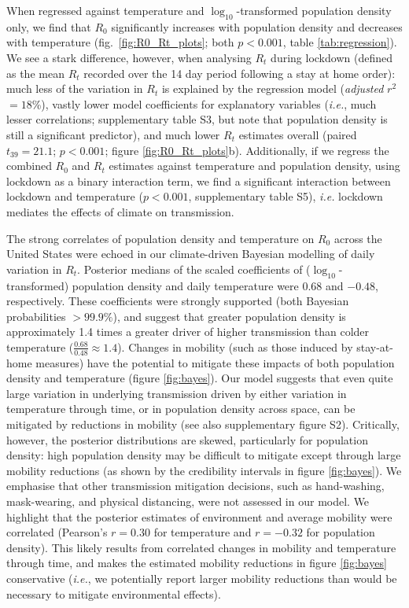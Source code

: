 \documentclass[12pt,english,a4paper]{article}
\newcommand{\RO}{$R_0$\xspace}
\begin{document}
When regressed against temperature and $\log_{10}$-transformed population density only, we find that \RO significantly increases with population density and decreases with temperature (fig.\ \ref{fig:R0_Rt_plots}; both $p < 0.001$, table \ref{tab:regression}).
We see a stark difference, however, when analysing $R_t$ during lockdown (defined as the mean $R_t$ recorded over the 14 day period following a stay at home order): much less of the variation in $R_t$ is explained by the regression model (\textsl{adjusted} $r^2$ $= 18$\%), vastly lower model coefficients for explanatory variables (\emph{i.e.}, much lesser correlations; supplementary table S3, but note that population density is still a significant predictor), and much lower $R_t$ estimates overall (paired $t_{39} = 21.1$; $p < 0.001$; figure \ref{fig:R0_Rt_plots}b). Additionally, if we regress the combined \RO and $R_t$ estimates against temperature and population density, using lockdown as a binary interaction term, we find a significant interaction between lockdown and temperature ($p < 0.001$, supplementary table S5), \emph{i.e.} lockdown mediates the effects of climate on transmission.


The strong correlates of population density and temperature on \RO across the United States were echoed in our climate-driven Bayesian modelling of daily variation in $R_t$. Posterior medians of the scaled coefficients of ($\log_{10}$-transformed) population density and daily temperature were $0.68$ and $-0.48$, respectively. These coefficients were strongly supported (both Bayesian probabilities $> 99.9\%$), and suggest that greater population density is approximately 1.4 times a greater driver of higher transmission than colder temperature ($\frac{0.68}{0.48} \approx 1.4$). 
Changes in mobility (such as those induced by stay-at-home measures) have the potential to mitigate these impacts of both population density and temperature (figure \ref{fig:bayes}).
Our model suggests that even quite large variation in underlying transmission driven by either variation in temperature through time, or in population density across space, can be mitigated by reductions in mobility (see also supplementary figure S2). Critically, however, the posterior distributions are skewed, particularly for population density: high population density may be difficult to mitigate except through large mobility reductions (as shown by the credibility intervals in figure \ref{fig:bayes}). We emphasise that other transmission mitigation decisions, such as hand-washing, mask-wearing, and physical distancing, were not assessed in our model.
We highlight that the posterior estimates of environment and average mobility were correlated (Pearson's $r = 0.30$ for temperature and $r = -0.32$ for population density). 
This likely results from correlated changes in mobility and temperature through time, and makes the estimated mobility reductions in figure \ref{fig:bayes} conservative (\emph{i.e.}, we potentially report larger mobility reductions than would be necessary to mitigate environmental effects).
\end{document}
